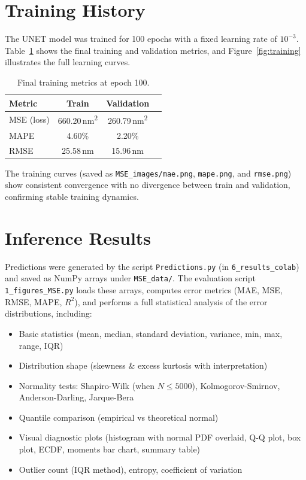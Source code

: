\documentclass[11pt,a4paper]{article}
\begin{document}
\section{Training History}

The UNET model was trained for 100 epochs with a fixed learning rate of $10^{-3}$. Table~\ref{tab:training_final} shows the final training and validation metrics, and Figure~\ref{fig:training} illustrates the full learning curves.

\begin{table}[H]
\centering
\caption{Final training metrics at epoch 100.}
\label{tab:training_final}
\begin{tabular}{lccc}
\toprule
\textbf{Metric} & \textbf{Train} & \textbf{Validation} \\
\midrule
MSE (loss)    & 660.20\,nm\textsuperscript{2} & 260.79\,nm\textsuperscript{2} \\
MAPE          & 4.60\% & 2.20\% \\
RMSE          & 25.58\,nm & 15.96\,nm \\
\bottomrule
\end{tabular}
\end{table}

The training curves (saved as \texttt{MSE\_images/mae.png}, \texttt{mape.png}, and \texttt{rmse.png}) show consistent convergence with no divergence between train and validation, confirming stable training dynamics.

\section{Inference Results}

Predictions were generated by the script \texttt{Predictions.py} (in \texttt{6\_results\_colab}) and saved as NumPy arrays under \texttt{MSE\_data/}. The evaluation script \texttt{1\_figures\_MSE.py} loads these arrays, computes error metrics (MAE, MSE, RMSE, MAPE, $R^2$), and performs a full statistical analysis of the error distributions, including:

\begin{itemize}
  \item Basic statistics (mean, median, standard deviation, variance, min, max, range, IQR)
  \item Distribution shape (skewness \& excess kurtosis with interpretation)
  \item Normality tests: Shapiro-Wilk (when $N \le 5000$), Kolmogorov-Smirnov, Anderson-Darling, Jarque-Bera
  \item Quantile comparison (empirical vs theoretical normal)
  \item Visual diagnostic plots (histogram with normal PDF overlaid, Q-Q plot, box plot, ECDF, moments bar chart, summary table)
  \item Outlier count (IQR method), entropy, coefficient of variation
\end{itemize}
\end{document}
